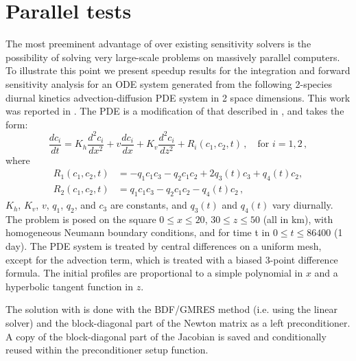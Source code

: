 \section{Parallel tests}\label{s:ex_tests}


The most preeminent advantage of {\cvodes} over existing sensitivity solvers is
the possibility of solving very large-scale problems on massively parallel 
computers. To illustrate this point we present speedup results for the 
integration and forward sensitivity analysis for
an ODE system generated from the following 2-species diurnal
kinetics advection-diffusion PDE system in 2 space dimensions.
This work was reported in \cite{SeHi:05}.
The PDE is a modification of that described in \cite{Wit:96}, and takes the form:
\begin{equation*}
  \frac{dc_i}{dt} = K_h \frac{d^2c_i}{dx^2} + v \frac{dc_i}{dx} 
  + K_v \frac{d^2c_i}{dz^2}
  + R_i(c_1, c_2, t) \, , \quad \text{for } i=1,2 \, ,
\end{equation*}
where
\begin{equation*}
  \begin{split}
    R_1(c_1,c_2,t) &= -q_1 c_1 c_3 - q_2 c_1 c_2 + 2 q_3(t) c_3 + q_4(t) c_2 , \\
    R_2(c_1,c_2,t) &=  q_1 c_1 c_3 - q_2 c_1 c_2 - q_4(t) c_2 \, ,
  \end{split}
\end{equation*}
$K_h$, $K_v$, $v$, $q_1$, $q_2$, and $c_3$ are constants, and $q_3(t)$ and $q_4(t)$
vary diurnally.   
The problem is posed on the square
$0 \le x \le 20$, $30 \le z \le 50$   (all in km),
with homogeneous Neumann boundary conditions, and for time t in
$0 \le t \le 86400$ (1 day).
The PDE system is treated by central differences on a uniform
mesh, except for the advection term, which is treated with a biased
3-point difference formula.
The initial profiles are proportional to a simple polynomial in $x$
and a hyperbolic tangent function in $z$.

The solution with {\cvodes} is done with the BDF/GMRES method (i.e.
using the {\cvspgmr} linear solver) and the block-diagonal part of the 
Newton matrix as a left preconditioner. A copy of the block-diagonal
part of the Jacobian is saved and conditionally reused within the
preconditioner setup function.

